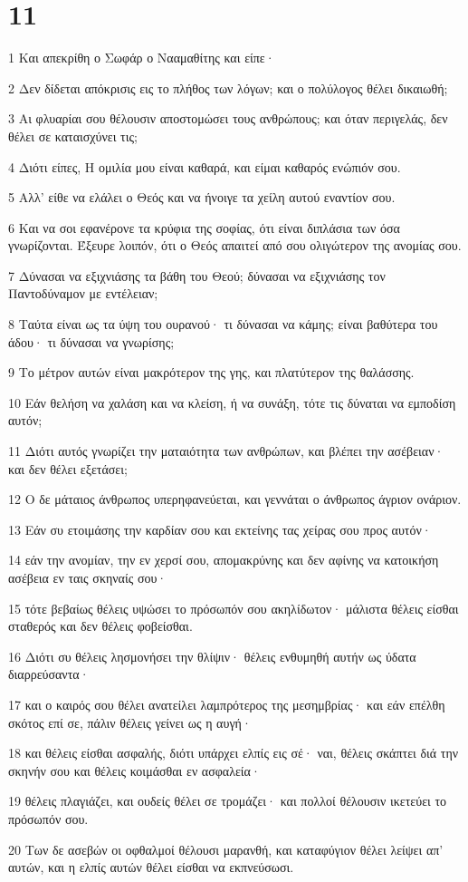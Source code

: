 \chapter{11}

\par 1 Και απεκρίθη ο Σωφάρ ο Νααμαθίτης και είπε·
\par 2 Δεν δίδεται απόκρισις εις το πλήθος των λόγων; και ο πολύλογος θέλει δικαιωθή;
\par 3 Αι φλυαρίαι σου θέλουσιν αποστομώσει τους ανθρώπους; και όταν περιγελάς, δεν θέλει σε καταισχύνει τις;
\par 4 Διότι είπες, Η ομιλία μου είναι καθαρά, και είμαι καθαρός ενώπιόν σου.
\par 5 Αλλ' είθε να ελάλει ο Θεός και να ήνοιγε τα χείλη αυτού εναντίον σου.
\par 6 Και να σοι εφανέρονε τα κρύφια της σοφίας, ότι είναι διπλάσια των όσα γνωρίζονται. Έξευρε λοιπόν, ότι ο Θεός απαιτεί από σου ολιγώτερον της ανομίας σου.
\par 7 Δύνασαι να εξιχνιάσης τα βάθη του Θεού; δύνασαι να εξιχνιάσης τον Παντοδύναμον με εντέλειαν;
\par 8 Ταύτα είναι ως τα ύψη του ουρανού· τι δύνασαι να κάμης; είναι βαθύτερα του άδου· τι δύνασαι να γνωρίσης;
\par 9 Το μέτρον αυτών είναι μακρότερον της γης, και πλατύτερον της θαλάσσης.
\par 10 Εάν θελήση να χαλάση και να κλείση, ή να συνάξη, τότε τις δύναται να εμποδίση αυτόν;
\par 11 Διότι αυτός γνωρίζει την ματαιότητα των ανθρώπων, και βλέπει την ασέβειαν· και δεν θέλει εξετάσει;
\par 12 Ο δε μάταιος άνθρωπος υπερηφανεύεται, και γεννάται ο άνθρωπος άγριον ονάριον.
\par 13 Εάν συ ετοιμάσης την καρδίαν σου και εκτείνης τας χείρας σου προς αυτόν·
\par 14 εάν την ανομίαν, την εν χερσί σου, απομακρύνης και δεν αφίνης να κατοικήση ασέβεια εν ταις σκηναίς σου·
\par 15 τότε βεβαίως θέλεις υψώσει το πρόσωπόν σου ακηλίδωτον· μάλιστα θέλεις είσθαι σταθερός και δεν θέλεις φοβείσθαι.
\par 16 Διότι συ θέλεις λησμονήσει την θλίψιν· θέλεις ενθυμηθή αυτήν ως ύδατα διαρρεύσαντα·
\par 17 και ο καιρός σου θέλει ανατείλει λαμπρότερος της μεσημβρίας· και εάν επέλθη σκότος επί σε, πάλιν θέλεις γείνει ως η αυγή·
\par 18 και θέλεις είσθαι ασφαλής, διότι υπάρχει ελπίς εις σέ· ναι, θέλεις σκάπτει διά την σκηνήν σου και θέλεις κοιμάσθαι εν ασφαλεία·
\par 19 θέλεις πλαγιάζει, και ουδείς θέλει σε τρομάζει· και πολλοί θέλουσιν ικετεύει το πρόσωπόν σου.
\par 20 Των δε ασεβών οι οφθαλμοί θέλουσι μαρανθή, και καταφύγιον θέλει λείψει απ' αυτών, και η ελπίς αυτών θέλει είσθαι να εκπνεύσωσι.

